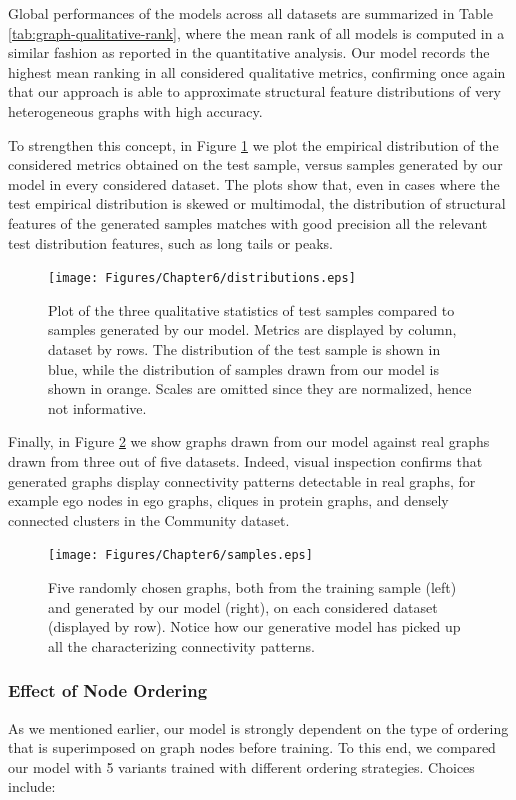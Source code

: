Global performances of the models across all datasets are summarized in Table \ref{tab:graph-qualitative-rank}, where the mean rank of all models is computed in a similar fashion as reported in the quantitative analysis. Our model records the highest mean ranking in all considered qualitative metrics, confirming once again that our approach is able to approximate structural feature distributions of very heterogeneous graphs with high accuracy.

To strengthen this concept, in Figure \ref{fig:distributions} we plot the empirical distribution of the considered metrics obtained on the test sample, versus samples generated by our model in every considered dataset. The plots show that, even in cases where the test empirical distribution is skewed or multimodal, the distribution of structural features of the generated samples matches with good precision all the relevant test distribution features, such as long tails or peaks.
\begin{figure}[h!]
\centering
\texttt{[image: Figures/Chapter6/distributions.eps]}
\caption{Plot of the three qualitative statistics of test samples compared to samples generated by our model. Metrics are displayed by column, dataset by rows. The distribution of the test sample is shown in blue, while the distribution of samples drawn from our model is shown in orange. Scales are omitted since they are normalized, hence not informative.}
\label{fig:distributions}
\end{figure}
Finally, in Figure \ref{fig:samples} we show graphs drawn from our model against real graphs drawn from three out of five datasets. Indeed, visual inspection confirms that generated graphs display connectivity patterns detectable in real graphs, for example ego nodes in ego graphs, cliques in protein graphs, and densely connected clusters in the Community dataset.
\begin{figure}[h!]
\centering
\texttt{[image: Figures/Chapter6/samples.eps]}
\caption{Five randomly chosen graphs, both from the training sample (left) and generated by our model (right), on each considered dataset (displayed by row). Notice how our generative model has picked up all the characterizing connectivity patterns.}
\label{fig:samples}
\end{figure}

\subsubsection*{Effect of Node Ordering}
As we mentioned earlier, our model is strongly dependent on the type of ordering that is superimposed on graph nodes before training. To this end, we compared our model with 5 variants trained with different ordering strategies. Choices include:

